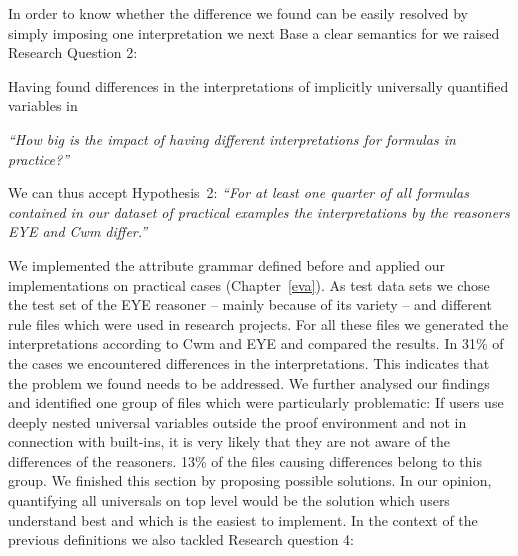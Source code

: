 
In order to know whether the difference we found can be easily resolved by simply imposing one interpretation we next 
Base a clear semantics for \nthree we %
raised Research Question 2:

Having found differences in the interpretations of implicitly universally quantified variables in \nthree

\emph{``How big is the impact of having different interpretations for \nthree formulas in practice?''}

We can thus accept Hypothesis~2: \emph{``For at least one quarter of all \nthree formulas contained in our dataset of practical examples the interpretations by the reasoners EYE and Cwm differ.''}



We implemented the attribute grammar defined before and applied our implementations on practical cases (Chapter~\ref{eva}). As test data sets we chose
the test set of the EYE reasoner -- mainly because of its variety -- and different 
rule files which were used in research projects. For all these files we generated the interpretations according to Cwm and EYE and compared the results. In 31\%
of the cases we encountered differences in the interpretations. This indicates that the problem we found needs to be addressed. We further analysed our findings and 
identified one group of files which were particularly problematic: If users use deeply nested universal variables outside the proof environment and 
not in connection with built-ins, it is very likely that they are not aware of the differences of the reasoners. 
13\% of the files causing differences belong to this group. We finished this section by proposing possible solutions. In our opinion, 
quantifying all universals on top level would be the solution which users understand best and which is the easiest to implement. In the context of the previous 
definitions we also tackled Research question 4:

